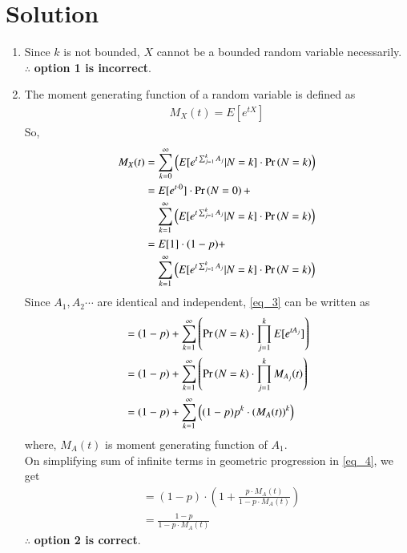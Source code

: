 \documentclass[journal,12pt,twocolumn]{IEEEtran}
\begin{document}
\section{Solution}
\begin{enumerate}
    \item Since $k$ is not bounded, $X$ cannot be a bounded random variable necessarily.\\
$\therefore$ \textbf{option 1 is incorrect}.\\
\item The moment generating function of a random variable is defined as
\begin{align}
    M_X(t)=E[e^{tX}]
\end{align}
So,
\begin{align}
    M_X(t)&=\sum_{k=0}^{\infty}\left(E[e^{t\sum_{j=1}^{k} A_j}
    |N=k]\cdot \pr{N=k}\right)\\
    &\begin{multlined}
    =E[e^{t\cdot 0}]\cdot \pr{N=0}+\\
    \sum_{k=1}^{\infty}\left(E[e^{t\sum_{j=1}^{k} A_j}
    |N=k]\cdot \pr{N=k}\right)
    \end{multlined}\\
    &\begin{multlined}
    =E[1]\cdot (1-p)+\\
    \sum_{k=1}^{\infty}\left(E[e^{t\sum_{j=1}^{k} A_j}|N=k]\cdot \pr{N=k}\right) \label{eq_3}
    \end{multlined}
\end{align}
Since $A_1,A_2\cdots$ are identical and independent, \eqref{eq_3} can be written as
\begin{align}
    &=(1-p)+\sum_{k=1}^{\infty}\left(\Pr\left(N=k\right)\cdot\prod_{j=1}^k E[e^{tA_j}]\right) \\
    &=(1-p)+\sum_{k=1}^{\infty}\left(\Pr\left(N=k\right)\cdot\prod_{j=1}^k M_{A_j}(t)\right) \\
   & =(1-p)+\sum_{k=1}^{\infty}\left((1-p)p^k\cdot(M_{A}(t))^k\right)\;\label{eq_4}
\end{align}
where, $M_{A}(t)$ is moment generating function of $A_1$.\\
On simplifying sum of infinite terms in geometric progression in \eqref{eq_4}, we get
\begin{align}
    &=(1-p)\cdot \left(1+\frac{p\cdot M_A(t)}{1-p\cdot M_A(t)}\right)\\
    &=\frac{1-p}{1-p\cdot M_A(t) }
\end{align}
$\therefore$ \textbf{option 2 is correct}.\\


\end{enumerate}
\end{document}
